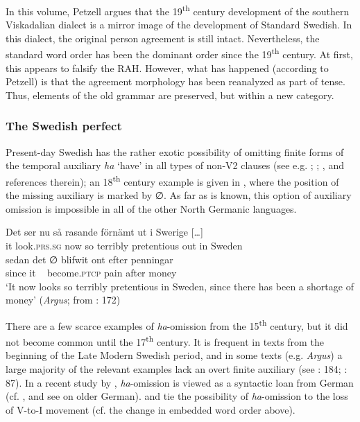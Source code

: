 \documentclass[output=paper]{langscibook}
\begin{document}
In this volume, Petzell argues that the 19\textsuperscript{th} century development of the southern Viskadalian dialect is a mirror image of the development of Standard Swedish. In this dialect, the original person agreement is still intact. Nevertheless, the standard word order has been the dominant order since the 19\textsuperscript{th} century. At first, this appears to falsify the RAH. However, what has happened (according to Petzell) is that the agreement morphology has been reanalyzed as part of tense. Thus, elements of the old grammar are preserved, but within a new category.


\subsubsection{ The Swedish perfect}\label{sec:intro:3.1.2}


Present-day Swedish has the rather exotic possibility of omitting finite forms of the temporal auxiliary \textit{ha} ‘have’ in all types of non-V2 clauses (see e.g. \citealt{Julien2002}; \citealt{AndreassonEtAl2004}; \citealt{Backstrom2019}, and references therein); an 18\textsuperscript{th} century example is given in , where the position of the missing auxiliary is marked by ∅. As far as is known, this option of auxiliary omission is impossible in all of the other North Germanic languages.


\ea\label{ex:intro:6}
\ea
\gll  Det     ser         nu   så rasande   förnämt   ut     i   Swerige […] \\
it     look.\textsc{prs.sg}   now   so terribly   pretentious out in   Sweden\\

\gll  sedan   det ∅ blifwit     ont     efter penningar\\
since   it  ~ become\textsc{.ptcp}  pain    after money\\

\glt ‘It now looks so terribly pretentious in Sweden, since there has been a shortage of money’ (\textit{Argus}; from \citealt{Johannisson1945}: 172)
\z
\z


There are a few scarce examples of \textit{ha}{}-omission from the 15\textsuperscript{th} century, but it did not become common until the 17\textsuperscript{th} century. It is frequent in texts from the beginning of the Late Modern Swedish period, and in some texts (e.g. \textit{Argus}) a large majority of the relevant examples lack an overt finite auxiliary (see \citealt{Johannisson1945}: 184; \citealt{Backstrom2019}: 87). In a recent study by \citet{Backstrom2019}, \textit{ha}{}-omission is viewed as a syntactic loan from German (cf. \citealt{Johannisson1945}, and see \citealt{Breitbarth2005} on older German). \citet{Larsson2009} and \citet{Sangfelt2019} tie the possibility of \textit{ha}{}-omission to the loss of V-to-I movement (cf. the change in embedded word order above).
\end{document}
